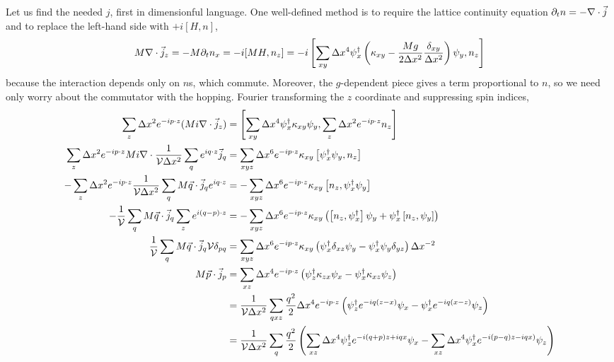 Let us find the needed $j$, first in dimensionful language.
One well-defined method is to require the lattice continuity equation $\partial_t n = -\nabla \cdot \vec{j}$ and to replace the left-hand side with $+i[H, n]$,
\begin{align}
	M\nabla\cdot\vec{j}_z = -M \partial_t n_x = -i[MH, n_z]
	=
	-i \left[
	\sum_{xy}\Delta x^4 \psi{}^{\dagger}_x \left(\kappa_{xy} - \frac{M g}{2 \Delta x^2} \frac{\delta_{xy}}{\Delta x^2}\right) \psi_y,
	n_z\right]
\end{align}
because the interaction depends only on $n$s, which commute.  Moreover, the $g$-dependent piece gives a term proportional to $n$, so we need only worry about the commutator with the hopping.
Fourier transforming the $z$ coordinate and suppressing spin indices,
\begin{align}
	\sum_z \Delta x^2 e^{-ip \cdot z} (M i\grad \cdot \vec{j}_z)
	&=
	\left[
	\sum_{xy}\Delta x^4 \psi\adjoint_x \kappa_{xy} \psi_y,
	\sum_z \Delta x^2 e^{-ip \cdot z} n_z\right]
\nonumber\\
	\sum_z \Delta x^2 e^{-ip \cdot z} M i\grad \cdot \oneover{\Volume \Delta x^2} \sum_q e^{i q\cdot z} \vec{j}_q
	&=
	\sum_{xyz} \Delta x^6 e^{-ip \cdot z} \kappa_{xy} \left[ \psi\adjoint_x \psi_y, n_z\right]
\nonumber\\
	-\sum_z \Delta x^2 e^{-ip \cdot z} \oneover{\Volume \Delta x^2} \sum_q M \vec{q} \cdot \vec{j}_q e^{i q\cdot z} 
	&=
	-\sum_{xyz} \Delta x^6 e^{-ip \cdot z} \kappa_{xy} \left[n_z, \psi\adjoint_x \psi_y\right]
\nonumber\\
	-\oneover{\Volume} \sum_q M \vec{q} \cdot \vec{j}_q \sum_z e^{i(q-p) \cdot z} 
	&=
	-\sum_{xyz} \Delta x^6 e^{-ip \cdot z} \kappa_{xy} \left(\left[n_z, \psi\adjoint_x\right]\psi_y + \psi\adjoint_x\left[n_z, \psi_y\right]\right)
\nonumber\\
	\oneover{\Volume} \sum_q M \vec{q} \cdot \vec{j}_q \Volume \delta_{pq}
	&=
	\sum_{xyz} \Delta x^6 e^{-ip \cdot z} \kappa_{xy} \left(\psi\adjoint_x\delta_{xz} \psi_y - \psi\adjoint_x \psi_y \delta_{yz}\right) \Delta x^{-2}
\nonumber\\
	M \vec{p} \cdot \vec{j}_p
	&=
	\sum_{xz} \Delta x^4 e^{-ip \cdot z} \left(\psi\adjoint_z \kappa_{zx} \psi_x - \psi\adjoint_x \kappa_{xz} \psi_z\right)
\nonumber\\
	&=
	\oneover{\Volume \Delta x^2}\sum_{qxz} \frac{q^2}{2} \Delta x^4 e^{-ip \cdot z} \left(\psi\adjoint_z e^{-iq(z-x)} \psi_x - \psi\adjoint_x e^{-iq(x-z)} \psi_z\right)
\nonumber\\
	&=
	\oneover{\Volume \Delta x^2}\sum_{q} \frac{q^2}{2} \left(\sum_{xz} \Delta x^4 \psi\adjoint_z e^{-i(q+p)z+iqx} \psi_x - \sum_{xz} \Delta x^4 \psi\adjoint_x e^{-i(p-q)z-iqx)} \psi_z\right)

\end{align}
